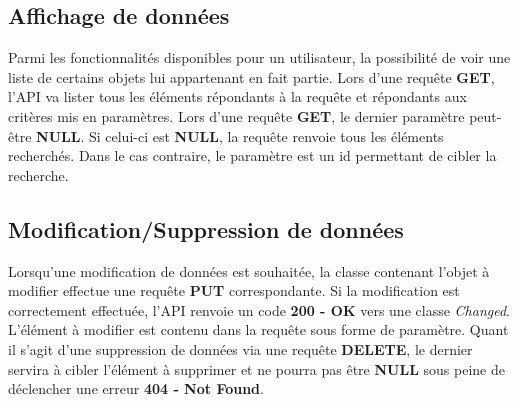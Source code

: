 \subsection{Affichage de données}
\begin{flushleft}
Parmi les fonctionnalités disponibles pour un utilisateur, la possibilité de voir une liste de certains objets lui appartenant en fait partie. Lors d'une requête \textbf{GET}, l'API va lister tous les éléments répondants à la requête et répondants aux critères mis en paramètres. Lors d'une requête \textbf{GET}, le dernier paramètre peut-être \textbf{NULL}. Si celui-ci est \textbf{NULL}, la requête renvoie tous les éléments recherchés. Dans le cas contraire, le paramètre est un id permettant de cibler la recherche.
\end{flushleft}

\subsection{Modification/Suppression de données}
\begin{flushleft}
Lorsqu'une modification de données est souhaitée, la classe contenant l'objet à modifier effectue une requête \textbf{PUT} correspondante. Si la modification est correctement effectuée, l'API renvoie un code \textbf{200 - OK} vers une classe \emph{Changed}. L'élément à modifier est contenu dans la requête sous forme de paramètre. Quant il s'agit d'une suppression de données via une requête \textbf{DELETE}, le dernier servira à cibler l'élément à supprimer et ne pourra pas être \textbf{NULL} sous peine de déclencher une erreur \textbf{404 - Not Found}.
\end{flushleft}

